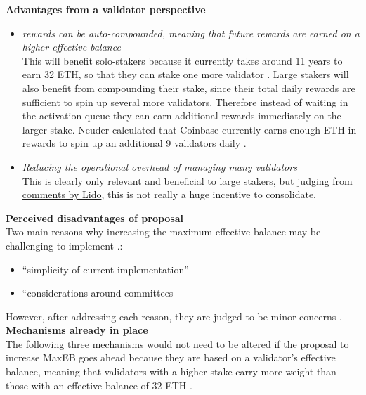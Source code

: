 \documentclass[UTF8]{article}
\begin{document}
\noindent
\textbf{Advantages from a validator perspective}
\begin{itemize}
\item \textit{rewards can be auto-compounded, meaning that future rewards are earned on a higher effective balance}\\
This will benefit solo-stakers because it currently takes around 11 years to earn 32 ETH, so that they can stake one more validator \cite{Neuder2023a}. Large stakers will also benefit from compounding their stake, since their total daily rewards are sufficient to spin up several more validators. Therefore instead of waiting in the activation queue they can earn additional rewards immediately on the larger stake. Neuder calculated that Coinbase currently earns enough ETH in rewards to spin up an additional 9 validators daily  \cite{Neuder2023a}. 
\item \textit{Reducing the operational overhead of managing many validators} \\
 This is clearly only relevant and beneficial to large stakers, but judging from \href{https://hackmd.io/wPqtVNjPTYa_tO5HEtq4_g}{comments by Lido}, this is not really a huge incentive to consolidate.
\end{itemize}

\noindent
\textbf{Perceived disadvantages of proposal}\\
Two main reasons why increasing the maximum effective balance may be challenging to implement \cite{Neuder2023a}.: 
\begin{itemize}
\item ``simplicity of current implementation''
\item ``considerations around committees
\end{itemize}

However, after addressing each reason, they are judged to be minor concerns  \cite{Neuder2023a}.\\

\noindent
\textbf{Mechanisms already in place}\\
The following three mechanisms would not need to be altered if the proposal to increase MaxEB goes ahead because they are based on a validator's effective balance, meaning that validators with a higher stake carry more weight than those with an effective balance of 32 ETH \cite{Neuder2023a}.
\end{document}
